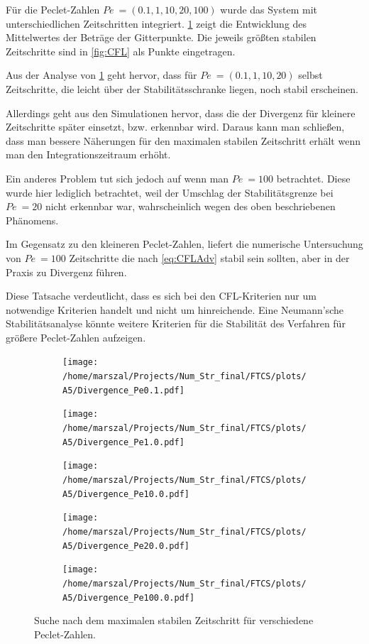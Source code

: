 Für die Peclet-Zahlen $Pe~=(0.1,1,10,20,100)$ wurde das System mit unterschiedlichen Zeitschritten integriert. \cref{fig:stab} zeigt die Entwicklung des Mittelwertes der Beträge der Gitterpunkte. Die jeweils größten stabilen Zeitschritte sind in \cref{fig:CFL} als Punkte eingetragen.

Aus der Analyse von \cref{fig:stab} geht hervor, dass für $Pe~=(0.1,1,10,20)$ selbst Zeitschritte, die leicht über der Stabilitätsschranke liegen, noch stabil erscheinen.

Allerdings geht aus den Simulationen hervor, dass die der Divergenz für kleinere Zeitschritte später einsetzt, bzw. erkennbar wird. Daraus kann man schließen, dass man bessere Näherungen für den maximalen stabilen Zeitschritt erhält wenn man den Integrationszeitraum erhöht.

Ein anderes Problem tut sich jedoch auf wenn man $Pe~=100$ betrachtet. Diese wurde hier lediglich betrachtet, weil der Umschlag der Stabilitätsgrenze bei $Pe~=20$ nicht erkennbar war, wahrscheinlich wegen des oben beschriebenen Phänomens.

Im Gegensatz zu den kleineren Peclet-Zahlen, liefert die numerische Untersuchung von $Pe~=100$ Zeitschritte die nach \cref{eq:CFLAdv} stabil sein sollten, aber in der Praxis zu Divergenz führen.

Diese Tatsache verdeutlicht, dass es sich bei den CFL-Kriterien nur um notwendige Kriterien handelt und nicht um hinreichende. Eine Neumann'sche Stabilitätsanalyse könnte weitere Kriterien für die Stabilität des Verfahren für größere Peclet-Zahlen aufzeigen.

\begin{figure}
  \centering
  \begin{subfigure}[b]{0.5\textwidth}
  \texttt{[image: /home/marszal/Projects/Num\_Str\_final/FTCS/plots/A5/Divergence\_Pe0.1.pdf]}
  \end{subfigure}
  \hspace{-0.5cm}
  \centering
  \begin{subfigure}[b]{0.5\textwidth}
  \texttt{[image: /home/marszal/Projects/Num\_Str\_final/FTCS/plots/A5/Divergence\_Pe1.0.pdf]}
  \end{subfigure}
  \hspace{-0.5cm}
  \centering
  \begin{subfigure}[b]{0.5\textwidth}
  \texttt{[image: /home/marszal/Projects/Num\_Str\_final/FTCS/plots/A5/Divergence\_Pe10.0.pdf]}
  \end{subfigure}
  \hspace{-0.5cm}
  \centering
  \begin{subfigure}[b]{0.5\textwidth}
  \texttt{[image: /home/marszal/Projects/Num\_Str\_final/FTCS/plots/A5/Divergence\_Pe20.0.pdf]}
  \end{subfigure}
  \hspace{-0.5cm}
  \centering
  \begin{subfigure}[b]{0.5\textwidth}
  \texttt{[image: /home/marszal/Projects/Num\_Str\_final/FTCS/plots/A5/Divergence\_Pe100.0.pdf]}
  \end{subfigure}
  \caption{Suche nach dem maximalen stabilen Zeitschritt für verschiedene Peclet-Zahlen.}\label{fig:stab}
\end{figure}
